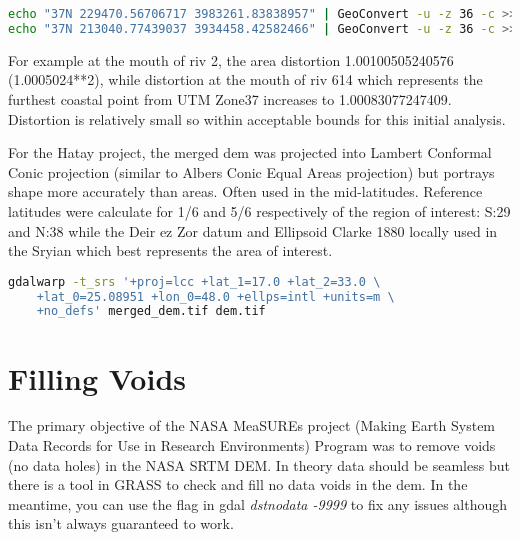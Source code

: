 \begin{lstlisting}[language=bash]
echo "37N 229470.56706717 3983261.83838957" | GeoConvert -u -z 36 -c >> 1.76284 1.0005024
echo "37N 213040.77439037 3934458.42582466" | GeoConvert -u -z 36 -c >> 1.64826 1.0004153
\end{lstlisting}

For example at the mouth of riv 2, the area distortion 1.00100505240576 (1.0005024**2), while distortion at the mouth of riv 614 which represents the furthest coastal point from UTM Zone37 increases to 1.00083077247409. Distortion is relatively small so within acceptable bounds for this initial analysis. 

For the Hatay project, the merged dem was projected into Lambert Conformal Conic projection (similar to Albers Conic Equal Areas projection) but portrays shape more accurately than areas. Often used in the mid-latitudes. Reference latitudes were calculate for 1/6 and 5/6 respectively of the region of interest: S:29 and N:38 while the Deir ez Zor datum and Ellipsoid Clarke 1880 locally used in the Sryian which best represents the area of interest.

\begin{lstlisting}[language=bash]
gdalwarp -t_srs '+proj=lcc +lat_1=17.0 +lat_2=33.0 \
	+lat_0=25.08951 +lon_0=48.0 +ellps=intl +units=m \
	+no_defs' merged_dem.tif dem.tif
\end{lstlisting}




\section{Filling Voids}

The primary objective of the NASA MeaSUREs project (Making Earth System Data Records for Use in Research Environments) Program was to remove voids (no data holes) in the NASA SRTM DEM. In theory data should be seamless but there is a tool in GRASS to check and fill no data voids in the dem. In the meantime, you can use the flag in gdal \textit{dstnodata -9999} to fix any issues although this isn’t always guaranteed to work. 